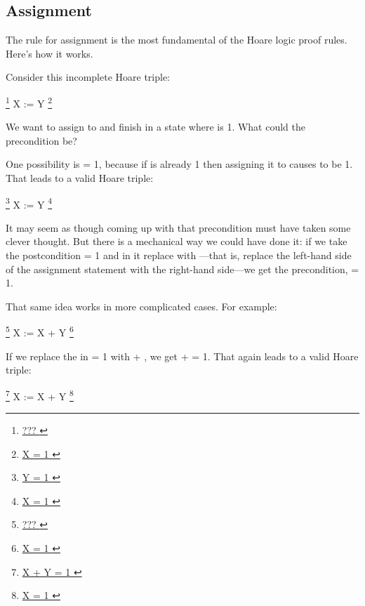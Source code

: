 \documentclass[12pt]{report}
\begin{document}
\subsection{Assignment}



 The rule for assignment is the most fundamental of the Hoare
    logic proof rules.  Here's how it works.


    Consider this incomplete Hoare triple:


       \footnote{\url{ ??? }}  X := Y  \footnote{\url{ X = 1 }}


    We want to assign  to  and finish in a state where  is 1.
    What could the precondition be?


    One possibility is  = 1, because if  is already 1 then
    assigning it to  causes  to be 1.  That leads to a valid
    Hoare triple:


       \footnote{\url{ Y = 1 }}  X := Y  \footnote{\url{ X = 1 }}


    It may seem as though coming up with that precondition must have
    taken some clever thought.  But there is a mechanical way we could
    have done it: if we take the postcondition  = 1 and in it
    replace  with ---that is, replace the left-hand side of the
    assignment statement with the right-hand side---we get the
    precondition,  = 1. 

 That same idea works in more complicated cases.  For
    example:


       \footnote{\url{ ??? }}  X := X + Y  \footnote{\url{ X = 1 }}


    If we replace the  in  = 1 with  + , we get  +  = 1.
    That again leads to a valid Hoare triple:


       \footnote{\url{ X + Y = 1 }}  X := X + Y  \footnote{\url{ X = 1 }}
\end{document}
